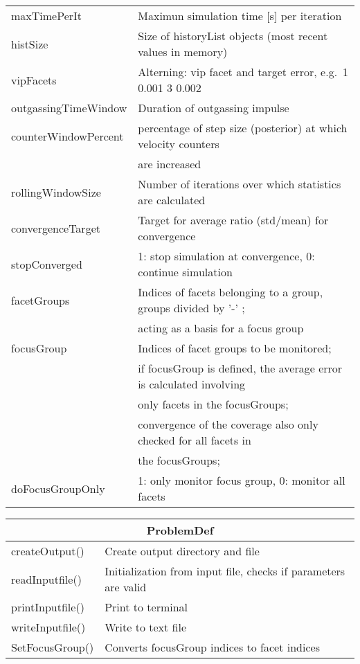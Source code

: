 \begin{center}
\begin{tabular}{|l|l|}
\rule{0pt}{3ex}  maxTimePerIt&  Maximun simulation time [s] per iteration\\
\rule{0pt}{3ex}  histSize&  Size of historyList objects (most recent values in memory)\\
\rule{0pt}{3ex}  vipFacets&  Alterning: vip facet and target error, e.g.\ 1 0.001 3 0.002\\
\rule{0pt}{3ex}  outgassingTimeWindow&  Duration of outgassing impulse\\
\rule{0pt}{3ex}  counterWindowPercent&  percentage of step size (posterior) at which velocity counters \\ & are increased\\
\rule{0pt}{3ex}  rollingWindowSize&  Number of iterations over which statistics are calculated\\
\rule{0pt}{3ex}  convergenceTarget&  Target for average ratio (std/mean) for convergence\\
\rule{0pt}{3ex}  stopConverged&  1: stop simulation at convergence, 0: continue simulation\\
\rule{0pt}{3ex}  facetGroups&  Indices of facets belonging to a group, groups divided by '-' ;\\ & acting as a basis for a focus group\\
\rule{0pt}{3ex}  focusGroup& Indices of facet groups to be monitored;\\
& if focusGroup is defined, the average error is calculated involving\\
& only facets in the focusGroups;\\
& convergence of the coverage also only checked for all facets in\\& the focusGroups;\\
\rule{0pt}{3ex} doFocusGroupOnly& 1: only monitor focus group, 0: monitor all facets\\
\hline
\end{tabular}
\end{center}
\begin{center}
	\begin{tabular}{|l|l|}
		\hline
		\multicolumn{2}{|c|}{\rule{0pt}{3ex}ProblemDef}\\
		\hline
		\rule{0pt}{3ex} createOutput()& Create output directory and file\\
		\rule{0pt}{3ex} readInputfile()& Initialization from input file, checks if parameters are valid\\
		\rule{0pt}{3ex} printInputfile()& Print to terminal\\
		\rule{0pt}{3ex} writeInputfile()& Write to text file\\
		\rule{0pt}{3ex} SetFocusGroup()& Converts focusGroup indices to facet indices\\
		\hline
	\end{tabular}
\end{center}


